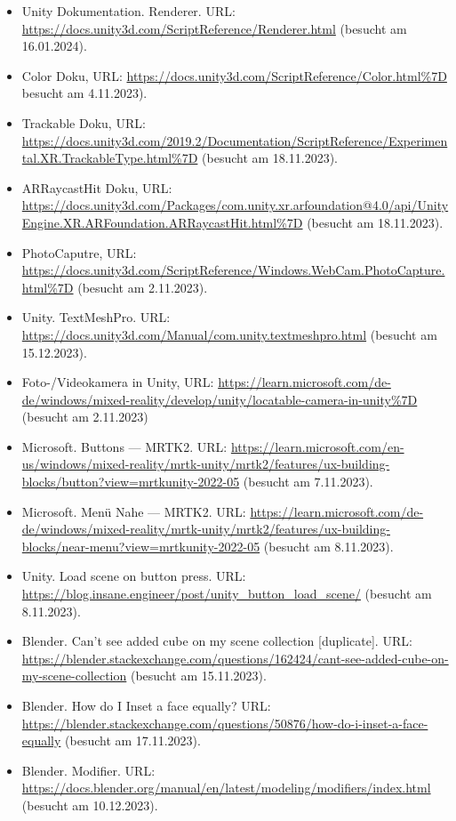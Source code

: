 \begin{itemize}
    \item Unity Dokumentation. Renderer. URL: \url{https://docs.unity3d.com/ScriptReference/Renderer.html} (besucht am 16.01.2024).
    \item Color Doku, URL:  \url{https://docs.unity3d.com/ScriptReference/Color.html%7D} besucht am 4.11.2023).
    \item Trackable Doku, URL:  \url{https://docs.unity3d.com/2019.2/Documentation/ScriptReference/Experimental.XR.TrackableType.html%7D} (besucht am 18.11.2023).
    \item ARRaycastHit Doku, URL:  \url{https://docs.unity3d.com/Packages/com.unity.xr.arfoundation@4.0/api/UnityEngine.XR.ARFoundation.ARRaycastHit.html%7D} (besucht am 18.11.2023).
    \item PhotoCaputre, URL:  \url{https://docs.unity3d.com/ScriptReference/Windows.WebCam.PhotoCapture.html%7D} (besucht am 2.11.2023).
    \item Unity. TextMeshPro. URL: \url{https://docs.unity3d.com/Manual/com.unity.textmeshpro.html} (besucht am 15.12.2023).
    \item Foto-/Videokamera in Unity, URL:  \url{https://learn.microsoft.com/de-de/windows/mixed-reality/develop/unity/locatable-camera-in-unity%7D} (besucht am 2.11.2023)
    \item Microsoft. Buttons — MRTK2. URL: \url{https://learn.microsoft.com/en-us/windows/mixed-reality/mrtk-unity/mrtk2/features/ux-building-blocks/button?view=mrtkunity-2022-05} (besucht am 7.11.2023).
    \item Microsoft. Menü Nahe — MRTK2. URL: \url{https://learn.microsoft.com/de-de/windows/mixed-reality/mrtk-unity/mrtk2/features/ux-building-blocks/near-menu?view=mrtkunity-2022-05} (besucht am 8.11.2023).
    \item Unity. Load scene on button press. URL: \url{https://blog.insane.engineer/post/unity_button_load_scene/} (besucht am 8.11.2023).
    \item Blender. Can't see added cube on my scene collection [duplicate]. URL: \url{https://blender.stackexchange.com/questions/162424/cant-see-added-cube-on-my-scene-collection} (besucht am 15.11.2023).
    \item Blender. How do I Inset a face equally? URL: \url{https://blender.stackexchange.com/questions/50876/how-do-i-inset-a-face-equally} (besucht am 17.11.2023).
    \item Blender. Modifier. URL: \url{https://docs.blender.org/manual/en/latest/modeling/modifiers/index.html} (besucht am 10.12.2023).

\end{itemize}
